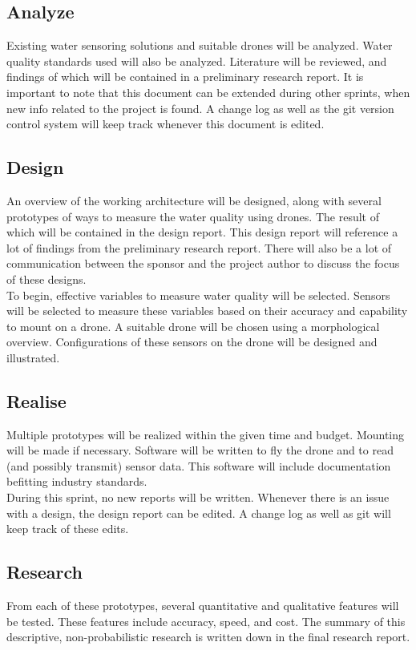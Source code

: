 \documentclass[11pt, a4paper]{article}
\begin{document}
\subsection{Analyze} \label{sprint:analyze}
Existing water sensoring solutions and suitable drones will be analyzed. Water quality standards used will also be analyzed. Literature will be reviewed, and findings of which will be contained in a preliminary research report.  It is important to note that this document can be extended during other sprints, when new info related to the project is found. A change log as well as the git version control system \cite{git} will keep track whenever this document is edited.

\subsection{Design} \label{sprint:design}
An overview of the working architecture will be designed, along with several prototypes of ways to measure the water quality using drones. The result of which will be contained in the design report. This design report will reference a lot of findings from the preliminary research report. There will also be a lot of communication between the sponsor and the project author to discuss the focus of these designs. \\

To begin, effective variables to measure water quality will be selected. Sensors will be selected to measure these variables based on their accuracy and capability to mount on a drone. A suitable drone will be chosen using a morphological overview. Configurations of these sensors on the drone will be designed and illustrated. 

\subsection{Realise} \label{sprint:realise}
Multiple prototypes will be realized within the given time and budget. Mounting will be made if necessary. Software will be written to fly the drone and to read (and possibly transmit) sensor data. This software will include documentation befitting industry standards.\\

During this sprint, no new reports will be written. Whenever there is an issue with a design, the design report can be edited. A change log as well as git will keep track of these edits.

\subsection{Research} \label{sprint:research}
From each of these prototypes, several quantitative and qualitative features will be tested. These features include accuracy, speed, and cost. The summary of this descriptive, non-probabilistic research is written down in the final research report.
\end{document}
